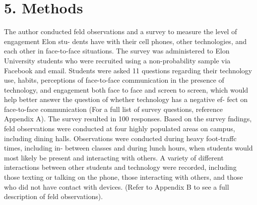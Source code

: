 \documentclass[11pt]{article} %
\begin{document}
\section{5. Methods}

The author conducted feld observations and a survey to measure the level of engagement Elon stu-
dents have with their cell phones, other technologies, and each other in face-to-face situations. 
The survey was administered to Elon University students who were recruited using a non-probability 
sample via Facebook and email. Students were asked 11 questions regarding their technology use, habits, 
perceptions of face-to-face communication in the presence of technology, and engagement both face to face 
and screen to screen, which would help better answer the question of whether technology has a negative ef-
fect on face-to-face communication (For a full list of survey questions, reference Appendix A).
The survey resulted in 100 responses.
Based on the survey fndings, feld observations were conducted at four highly populated areas on 
campus, including dining halls. Observations were conducted during heavy foot-traffc times, including in-
between classes and during lunch hours, when students would most likely be present and interacting with 
others. A variety of different interactions between other students and technology were recorded, including 
those texting or talking on the phone, those interacting with others, and those who did not have contact with 
devices. (Refer to Appendix B to see a full description of feld observations). 
\end{document}
